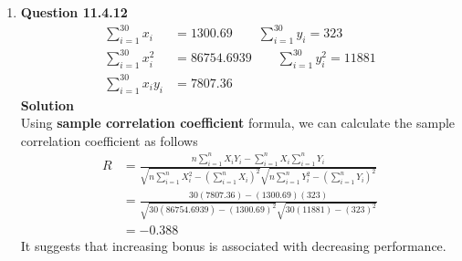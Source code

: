 \documentclass{uofa-eng-assignment}
\begin{document}
\begin{enumerate}
    \item[]
        \textbf{Question 11.4.12} \\
        \begin{align*}
            \sum_{i=1}^{30}x_i    & = 1300.69 \qquad \sum_{i=1}^{30}y_i = 323        \\
            \sum_{i=1}^{30}x_i^2  & = 86754.6939 \qquad \sum_{i=1}^{30}y_i^2 = 11881 \\
            \sum_{i=1}^{30}x_iy_i & = 7807.36
        \end{align*}
        \textbf{Solution} \\
        Using \textbf{sample correlation coefficient} formula, we can calculate the sample correlation coefficient as follows
        \begin{align*}
            R & = \frac{n\sum_{i=1}^{n}X_iY_i - \sum_{i=1}^{n}X_i\sum_{i=1}^{n}Y_i}{\sqrt{n\sum_{i=1}^{n}X_i^2 - \left(\sum_{i=1}^{n}X_i\right)^2}\sqrt{n\sum_{i=1}^{n}Y_i^2 - \left(\sum_{i=1}^{n}Y_i\right)^2}} \\
              & = \frac{30(7807.36) - (1300.69)(323)}{\sqrt{30(86754.6939) - (1300.69)^2}\sqrt{30(11881) - (323)^2}}                                                                                              \\
              & = -0.388
        \end{align*}
        It suggests that increasing bonus is associated with decreasing performance.
\end{enumerate}
\end{document}
